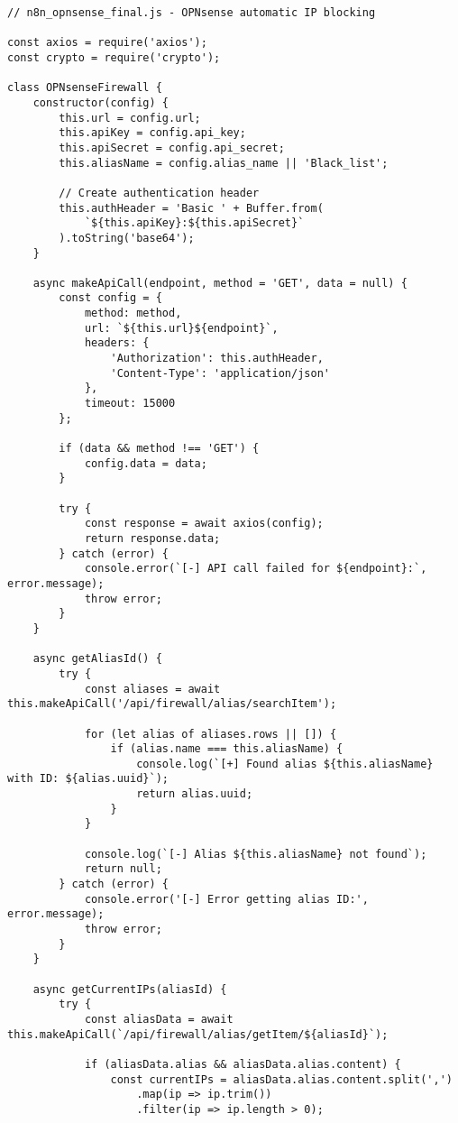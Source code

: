 \begin{lstlisting}[style=jsstyle,caption=Script n8n pour blocage automatique IP OPNsense]
// n8n_opnsense_final.js - OPNsense automatic IP blocking

const axios = require('axios');
const crypto = require('crypto');

class OPNsenseFirewall {
    constructor(config) {
        this.url = config.url;
        this.apiKey = config.api_key;
        this.apiSecret = config.api_secret;
        this.aliasName = config.alias_name || 'Black_list';
        
        // Create authentication header
        this.authHeader = 'Basic ' + Buffer.from(
            `${this.apiKey}:${this.apiSecret}`
        ).toString('base64');
    }

    async makeApiCall(endpoint, method = 'GET', data = null) {
        const config = {
            method: method,
            url: `${this.url}${endpoint}`,
            headers: {
                'Authorization': this.authHeader,
                'Content-Type': 'application/json'
            },
            timeout: 15000
        };

        if (data && method !== 'GET') {
            config.data = data;
        }

        try {
            const response = await axios(config);
            return response.data;
        } catch (error) {
            console.error(`[-] API call failed for ${endpoint}:`, error.message);
            throw error;
        }
    }

    async getAliasId() {
        try {
            const aliases = await this.makeApiCall('/api/firewall/alias/searchItem');
            
            for (let alias of aliases.rows || []) {
                if (alias.name === this.aliasName) {
                    console.log(`[+] Found alias ${this.aliasName} with ID: ${alias.uuid}`);
                    return alias.uuid;
                }
            }
            
            console.log(`[-] Alias ${this.aliasName} not found`);
            return null;
        } catch (error) {
            console.error('[-] Error getting alias ID:', error.message);
            throw error;
        }
    }

    async getCurrentIPs(aliasId) {
        try {
            const aliasData = await this.makeApiCall(`/api/firewall/alias/getItem/${aliasId}`);
            
            if (aliasData.alias && aliasData.alias.content) {
                const currentIPs = aliasData.alias.content.split(',')
                    .map(ip => ip.trim())
                    .filter(ip => ip.length > 0);
                

\end{lstlisting}
